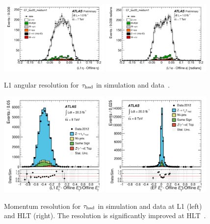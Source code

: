 \begin{figure}[!htpb]
  \centering
  \includegraphics[width=0.48\textwidth]{figures/ATL-COM-DAQ-2012-001/c_L1_etares}
  \includegraphics[width=0.48\textwidth]{figures/ATL-COM-DAQ-2012-001/c_L1_phires}
  \caption{L1 angular resolution for $\tau_\text{had}$ in simulation and data~\cite{ATL-COM-DAQ-2012-001}.}
  \label{fig:prospects-trigger-2011-angular}
\end{figure}

\begin{figure}[!htpb]
  \centering
  \includegraphics[width=0.48\textwidth]{figures/PERF-2013-06/fig_18a}
  \includegraphics[width=0.48\textwidth]{figures/PERF-2013-06/fig_18c}
  \caption{Momentum resolution for $\tau_\text{had}$ in simulation and data at L1 (left) and HLT (right). The resolution is significantly improved at HLT~\cite{PERF-2013-06}.}
  \label{fig:prospects-trigger-resolution}
\end{figure}

